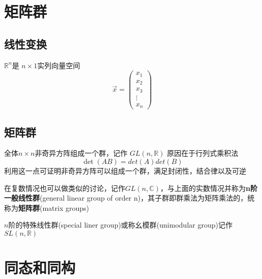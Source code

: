 \section{矩阵群}
\subsection{线性变换}
$\mathbb{R}^{n}$是 $n\times 1$实列向量空间
\[\vec{x}=\begin{pmatrix}
    x_1\\x_2\\x_3\\\vdots\\x_n
\end{pmatrix}\]  
\subsection{矩阵群}
全体$n\times n$非奇异方阵组成一个群，记作 $GL(n,\mathbb{R})$ 原因在于行列式乘积法
\[\det(AB)=det(A)det(B)\] 
利用这一点可证明非奇异方阵可以组成一个群，满足封闭性，结合律以及可逆

在复数情况也可以做类似的讨论，记作$GL(n,\mathbb{C})$，与上面的实数情况并称为\textbf{n阶一般线性群}(general linear group of order n)，其子群即群乘法为矩阵乘法的，统称为\textbf{矩阵群}(matrix groups)
\begin{eg}
    $n$阶的特殊线性群(special liner group)或称幺模群(unimodular group)记作$SL(n,\mathbb{R})$
\end{eg}
\section{同态和同构}
